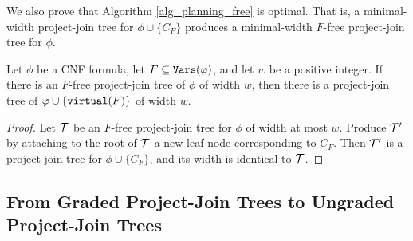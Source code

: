 We also prove that Algorithm \ref{alg_planning_free} is optimal. That is, a minimal-width project-join tree for $\phi \cup \{C_F\}$ produces a minimal-width $F$-free project-join tree for $\phi$. 
\begin{theorem}
\label{thm:planning_free_optimal}
Let $\phi$ be a CNF formula, let $F \subseteq \texttt{\upshape Vars}(\varphi)$, and let $w$ be a positive integer. %
If there is an $F$-free project-join tree of $\phi$ of width $w$, then there is a project-join tree of $\varphi \cup \{\texttt{\upshape virtual}(F)\}$ of width $w$.
\end{theorem}
\begin{proof}
Let $\mathcal{T}$ be an $F$-free project-join tree for $\phi$ of width at most $w$. 
Produce $\mathcal{T}'$ by attaching to the root of $\mathcal{T}$ a new leaf node corresponding to $C_F$. 
Then $\mathcal{T}'$ is a project-join tree for $\phi \cup \{C_F\}$, and its width is identical to $\mathcal{T}$.
\end{proof}




\subsection{From Graded Project-Join Trees to Ungraded Project-Join Trees}

